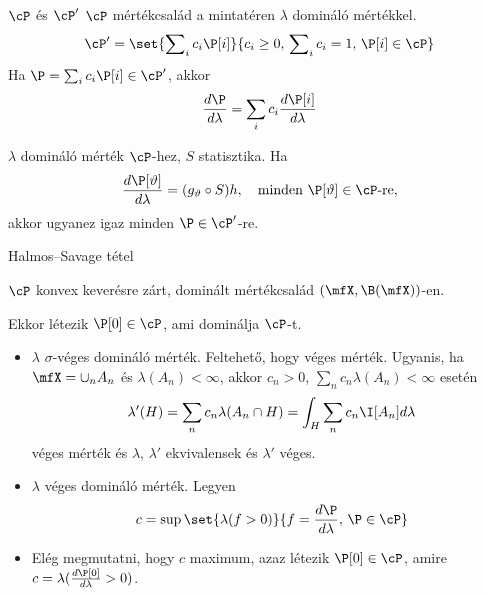 \documentclass[aspectratio=169,notheorems,9pt,\option]{beamer}
\begin{document}
\begin{frame}{$\cP$ és $\cP'$}
$\cP$ %
mértékcsalád a mintatéren $\lambda$ domináló mértékkel.
\begin{displaymath}
  \cP'=\set{\sum\nolimits_i c_i\P[i]}{c_i\geq0,\,\sum\nolimits_i c_i=1,\,\P[i]\in\cP}  
\end{displaymath}
Ha $\P=\sum_i c_i\P[i]\in\cP'$, akkor
\begin{displaymath}
  \frac{d\P}{d\lambda} = \sum_{i} c_i\frac{d\P[i]}{d\lambda}
\end{displaymath}

\begin{proposition}
  $\lambda $ domináló mérték $\cP$-hez, $S$ statisztika. Ha
  \begin{displaymath}
    \frac{d\P[\theta]}{d\lambda}=(g_{\theta}\circ S)h,\quad \text{minden $\P[\theta]\in\cP$-re},
  \end{displaymath} 
  akkor ugyanez igaz minden $\P\in\cP'$-re.
\end{proposition}
\end{frame}

\begin{frame}{Halmos--Savage tétel}
\begin{theorem}
  $\cP$ konvex keverésre zárt, dominált mértékcsalád $(\mfX,\B(\mfX))$-en. 
  
  Ekkor létezik $\P[0]\in\cP$, ami dominálja $\cP$-t.
\end{theorem}
\begin{itemize}
  \item $\lambda$ $\sigma$-véges domináló mérték. Feltehető, hogy véges mérték. Ugyanis,
   ha $\mfX=\cup_n A_n$ és $\lambda(A_n)<\infty$, akkor 
   $c_n>0$, $\sum_n c_n\lambda(A_n)<\infty$ esetén
   \begin{displaymath}
     \lambda'(H)=\sum_n c_n \lambda(A_n\cap H)=\int_H \sum_n c_n\I[A_n] d\lambda
   \end{displaymath}
   véges mérték és $\lambda$, $\lambda'$ ekvivalensek és $\lambda'$ véges.
   \item $\lambda$ véges domináló mérték. Legyen
   \begin{displaymath}
    c=\sup\set{\lambda(f>0)}{f=\frac{d\P}{d\lambda},\,\P\in\cP}
   \end{displaymath}
   \item Elég megmutatni, hogy $c$ maximum, 
   azaz létezik $\P[0]\in\cP$, amire $c=\lambda(\frac{d\P[0]}{d\lambda}>0)$.     
\end{itemize}

\end{frame}
\end{document}
